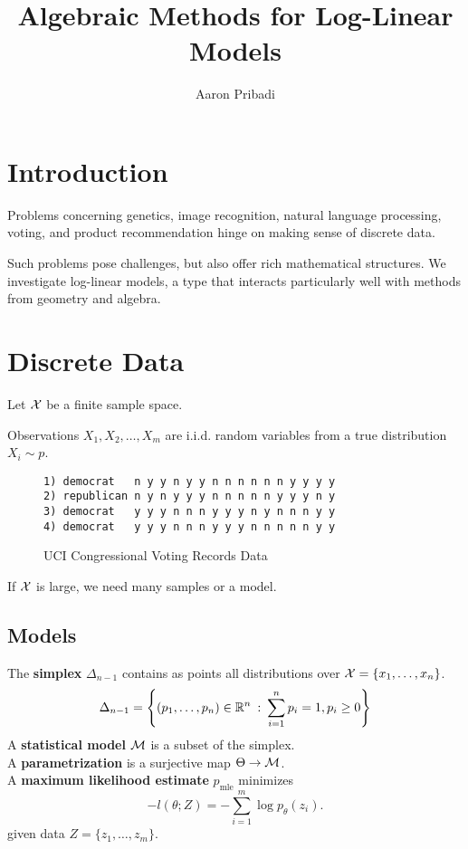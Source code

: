 \documentclass[thesis]{hmcposter}
\author{Aaron Pribadi}
\title{Algebraic Methods for Log-Linear Models}
\newcommand{\mterm}[1]{\textbf{\textcolor{cterm}{#1}}}
\newcommand*{\STB}{\::\:}
\newcommand*{\mle}{\mathrm{mle}}
\newcommand*{\halfspace}{\vspace{0.5\baselineskip}}
\newcommand*{\nhalfspace}{\vspace{-0.5\baselineskip}}
\begin{document}
\begin{poster}

\section{Introduction}
\nhalfspace

Problems concerning genetics, image recognition, natural language processing,
voting, and product recommendation hinge on making sense of discrete data.

Such problems pose challenges, but also offer rich mathematical structures.  We
investigate log-linear models, a type that interacts particularly well with
methods from geometry and algebra.

\nhalfspace
\section{Discrete Data}
\nhalfspace

Let $\mathcal{X}$ be a finite sample space.  

Observations $X_1, X_2, \ldots, X_m$ are i.i.d. random variables
from a true distribution $X_i \sim p$.

\halfspace
\begin{figure}
    \centering
    \small
\begin{verbatim}
1) democrat   n y y n y y n n n n n n y y y y
2) republican n y n y y y n n n n n y y y n y
3) democrat   y y y n n n y y y n y n n n y y
4) democrat   y y y n n n y y y n n n n n y y
\end{verbatim}
    \caption{UCI Congressional Voting Records
    Data}
\end{figure}
\halfspace
\noindent If $\mathcal{X}$ is large, we need many samples or a model.

\nhalfspace
\subsection{Models}
\nhalfspace
The \mterm{simplex} $\Delta_{n-1}$ contains as points all 
distributions over $\mathcal{X} = \{x_1, \ldots, x_n\}$.
\[
    \Delta_{n-1} = 
    \left\{(p_1, \ldots, p_{n}) \in \R^n \STB
    \sum_{i=1}^{n} p_i= 1, p_i \ge 0 \right\} 
\]
\noindent A \mterm{statistical model} $\mathcal{M}$ is a subset of the simplex.  \\
A \mterm{parametrization} is a surjective map $\Theta \to \mathcal{M}$. \\
A \mterm{maximum likelihood estimate} $p_\mle$ minimizes 
\[
    -l(\theta; Z) = -\sum_{i=1}^m \log p_\theta(z_i).
\]
given data $Z = \{z_1, \ldots, z_m\}$.


\end{poster}
\end{document}
